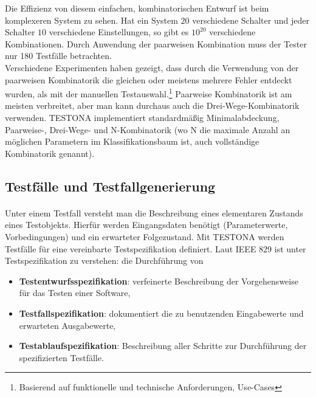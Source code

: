 Die Effizienz von diesem einfachen, kombinatorischen Entwurf ist beim komplexeren System zu sehen. Hat ein System $20$ verschiedene Schalter und jeder Schalter $10$ verschiedene Einstellungen, so gibt es $10^{20}$ verschiedene Kombinationen. Durch Anwendung der paarweisen Kombination muss der Tester nur 180 Testfälle betrachten.\\

Verschiedene Experimenten haben gezeigt, dass durch die Verwendung von der paarweisen Kombinatorik die gleichen oder meistens mehrere Fehler entdeckt wurden, als mit der manuellen Testauswahl\cite{CombinatorialSoftTesting}.\footnote{Basierend auf funktionelle und technische Anforderungen, Use-Cases} Paarweise Kombinatorik ist am meisten verbreitet, aber man kann durchaus auch die Drei-Wege-Kombinatorik verwenden. TESTONA implementiert standardmäßig Minimalabdeckung, Paarweise-, Drei-Wege- und N-Kombinatorik (wo N die maximale Anzahl an möglichen Parametern im Klassifikationsbaum ist, auch vollständige Kombinatorik genannt).\\




\subsection{Testfälle und Testfallgenerierung}
\paragraph{}

Unter einem Testfall versteht man die Beschreibung eines elementaren Zustands eines Testobjekts. Hierfür werden Eingangsdaten benötigt (Parameterwerte, Vorbedingungen) und ein erwarteter Folgezustand. Mit TESTONA werden Testfälle für eine vereinbarte Testspezifikation definiert. Laut IEEE 829 ist unter Testspezifikation zu verstehen: die Durchführung von

\begin{itemize}
\item\textbf{Testentwurfsspezifikation}: verfeinerte Beschreibung der Vorgehensweise für das Testen einer Software,
\item \textbf{Testfallspezifikation}: dokumentiert die zu benutzenden Eingabewerte und erwarteten Ausgabewerte,
\item \textbf{Testablaufspezifikation}: Beschreibung aller Schritte zur Durchführung der spezifizierten Testfälle.
\end{itemize}

